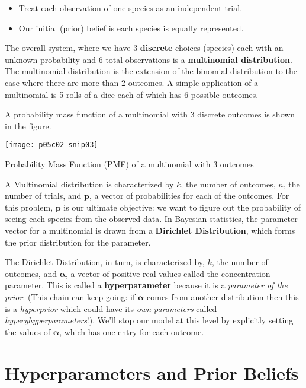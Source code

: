 \begin{itemize}
\item Treat each observation of one species as an independent trial.
\item Our initial (prior) belief is each species is equally represented.
\end{itemize}

The overall system, where we have 3 \textbf{discrete} choices (species) each with an unknown probability and 6 total observations is a\textbf{ multinomial distribution}. The multinomial distribution is the extension of the binomial distribution to the case where there are more than 2 outcomes. A simple application of a multinomial is 5 rolls of a dice each of which has 6 possible outcomes.

A probability mass function \cite{WikipeadiaProbabilitymassfunction2019} of a multinomial with 3 discrete outcomes is shown in the figure.

\begin{marginfigure}
    \texttt{[image: p05c02-snip03]}
    \caption{Probability Mass Function (PMF) of a multinomial with 3 outcomes}
    \end{marginfigure}

A Multinomial distribution is characterized by $k$, the number of outcomes, $n$, the number of trials, and 
$\mathbf {p}$, a vector of probabilities for each of the outcomes. For this problem, $\mathbf {p}$ is our ultimate objective: we want to figure out the probability of seeing each species from the observed data. In Bayesian statistics, the parameter vector for a multinomial is drawn from a \textbf{Dirichlet Distribution}, which forms the prior distribution for the parameter.

The Dirichlet Distribution, in turn, is characterized by, $k$, the number of outcomes, and  $\boldsymbol {\alpha }$, a vector of positive real values called the concentration parameter. This is called a \textbf{hyperparameter} because it is a \textit{parameter of the prior}. (This chain can keep going: if  $\boldsymbol {\alpha }$ comes from another distribution then this is a \textit{hyperprior} which could have its \textit{own parameters} called \textit{hyperyhyperparameters}!). We'll stop our model at this level by explicitly setting the values of $\boldsymbol {\alpha }$, which has one entry for each outcome.

\section{Hyperparameters and Prior Beliefs}

